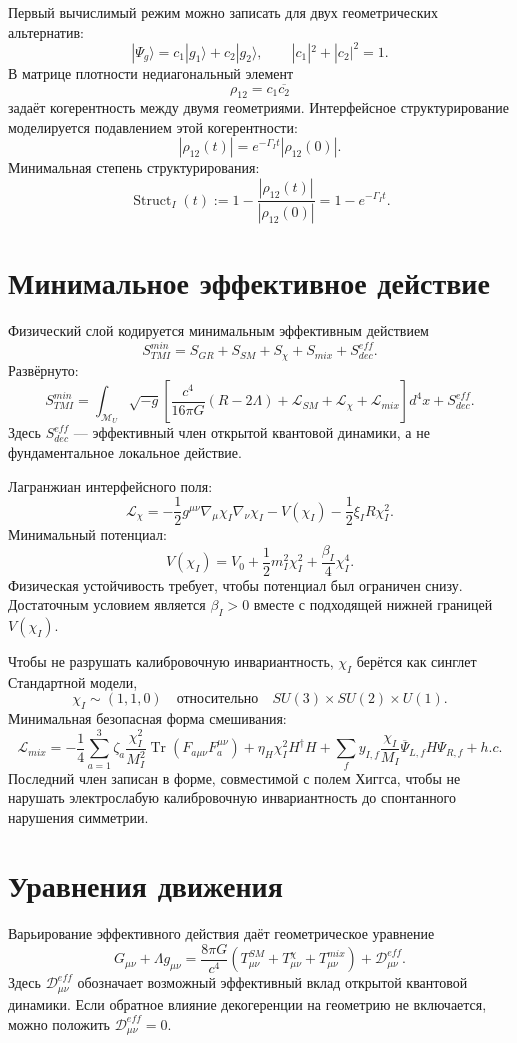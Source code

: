 \documentclass[12pt,a4paper]{article}
\DeclareMathOperator{\Struct}{Struct}
\DeclareMathOperator{\Tr}{Tr}
\newcommand{\M}{\mathcal M_U}
\newcommand{\Lag}{\mathcal L}
\begin{document}
Первый вычислимый режим можно записать для двух геометрических альтернатив:
\[
|\Psi_g\rangle=c_1|g_1\rangle+c_2|g_2\rangle,
\qquad |c_1|^2+|c_2|^2=1.
\]
В матрице плотности недиагональный элемент
\[
\rho_{12}=c_1\overline{c_2}
\]
задаёт когерентность между двумя геометриями. Интерфейсное структурирование моделируется подавлением этой когерентности:
\[
\boxed{
|\rho_{12}(t)|=e^{-\Gamma_I t}|\rho_{12}(0)|.
}
\]
Минимальная степень структурирования:
\[
\boxed{
\Struct_I(t):=1-\frac{|\rho_{12}(t)|}{|\rho_{12}(0)|}=1-e^{-\Gamma_I t}.
}
\]

\section{Минимальное эффективное действие}
Физический слой кодируется минимальным эффективным действием
\[
\boxed{
S_{TMI}^{min}=S_{GR}+S_{SM}+S_\chi+S_{mix}+S_{dec}^{eff}.
}
\]
Развёрнуто:
\[
\boxed{
S_{TMI}^{min}
=
\int_{\M}\sqrt{-g}\left[
\frac{c^4}{16\pi G}(R-2\Lambda)
+\Lag_{SM}+\Lag_\chi+\Lag_{mix}
\right]d^4x
+S_{dec}^{eff}.
}
\]
Здесь $S_{dec}^{eff}$ — эффективный член открытой квантовой динамики, а не фундаментальное локальное действие.

Лагранжиан интерфейсного поля:
\[
\boxed{
\Lag_\chi
=-\frac12 g^{\mu\nu}\nabla_\mu\chi_I\nabla_\nu\chi_I
-V(\chi_I)-\frac12\xi_I R\chi_I^2.
}
\]
Минимальный потенциал:
\[
\boxed{
V(\chi_I)=V_0+\frac12 m_I^2\chi_I^2+\frac{\beta_I}{4}\chi_I^4.
}
\]
Физическая устойчивость требует, чтобы потенциал был ограничен снизу. Достаточным условием является $\beta_I>0$ вместе с подходящей нижней границей $V(\chi_I)$.

Чтобы не разрушать калибровочную инвариантность, $\chi_I$ берётся как синглет Стандартной модели,
\[
\chi_I\sim (1,1,0)
\quad \text{относительно}\quad SU(3)\times SU(2)\times U(1).
\]
Минимальная безопасная форма смешивания:
\[
\boxed{
\Lag_{mix}
=
-\frac14\sum_{a=1}^{3}\zeta_a\frac{\chi_I^2}{M_I^2}\Tr(F_{a\mu\nu}F_a^{\mu\nu})
+\eta_H\chi_I^2H^\dagger H
+\sum_f y_{I,f}\frac{\chi_I}{M_I}\overline{\Psi}_{L,f}H\Psi_{R,f}+h.c.
}
\]
Последний член записан в форме, совместимой с полем Хиггса, чтобы не нарушать электрослабую калибровочную инвариантность до спонтанного нарушения симметрии.

\section{Уравнения движения}
Варьирование эффективного действия даёт геометрическое уравнение
\[
\boxed{
G_{\mu\nu}+\Lambda g_{\mu\nu}
=
\frac{8\pi G}{c^4}
\left(T_{\mu\nu}^{SM}+T_{\mu\nu}^{\chi}+T_{\mu\nu}^{mix}\right)
+\mathcal D_{\mu\nu}^{eff}.
}
\]
Здесь $\mathcal D_{\mu\nu}^{eff}$ обозначает возможный эффективный вклад открытой квантовой динамики. Если обратное влияние декогеренции на геометрию не включается, можно положить $\mathcal D_{\mu\nu}^{eff}=0$.
\end{document}

